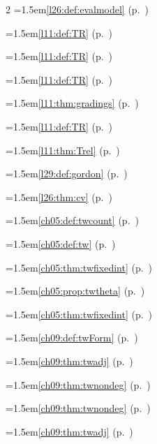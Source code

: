 \begin{multicols}{2}
\hangindent=1.5em\quad \ref{l26:def:evalmodel} (p.~\pageref{l26:def:evalmodel})\par
\hangindent=1.5em\quad \ref{l11:def:TR} (p.~\pageref{l11:def:TR})\par
\hangindent=1.5em\quad \ref{l11:def:TR} (p.~\pageref{l11:def:TR})\par
\hangindent=1.5em\quad \ref{l11:def:TR} (p.~\pageref{l11:def:TR})\par
\hangindent=1.5em\quad \ref{l11:thm:gradings} (p.~\pageref{l11:thm:gradings})\par
\hangindent=1.5em\quad \ref{l11:def:TR} (p.~\pageref{l11:def:TR})\par
\hangindent=1.5em\quad \ref{l11:thm:Trel} (p.~\pageref{l11:thm:Trel})\par
\hangindent=1.5em\quad \ref{l29:def:gordon} (p.~\pageref{l29:def:gordon})\par
\hangindent=1.5em\quad \ref{l26:thm:cv} (p.~\pageref{l26:thm:cv})\par
\hangindent=1.5em\quad \ref{ch05:def:twcount} (p.~\pageref{ch05:def:twcount})\par
\hangindent=1.5em\quad \ref{ch05:def:tw} (p.~\pageref{ch05:def:tw})\par
\hangindent=1.5em\quad \ref{ch05:thm:twfixedint} (p.~\pageref{ch05:thm:twfixedint})\par
\hangindent=1.5em\quad \ref{ch05:prop:twtheta} (p.~\pageref{ch05:prop:twtheta})\par
\hangindent=1.5em\quad \ref{ch05:thm:twfixedint} (p.~\pageref{ch05:thm:twfixedint})\par
\hangindent=1.5em\quad \ref{ch09:def:twForm} (p.~\pageref{ch09:def:twForm})\par
\hangindent=1.5em\quad \ref{ch09:thm:twadj} (p.~\pageref{ch09:thm:twadj})\par
\hangindent=1.5em\quad \ref{ch09:thm:twnondeg} (p.~\pageref{ch09:thm:twnondeg})\par
\hangindent=1.5em\quad \ref{ch09:thm:twnondeg} (p.~\pageref{ch09:thm:twnondeg})\par
\hangindent=1.5em\quad \ref{ch09:thm:twadj} (p.~\pageref{ch09:thm:twadj})\par

\end{multicols}
